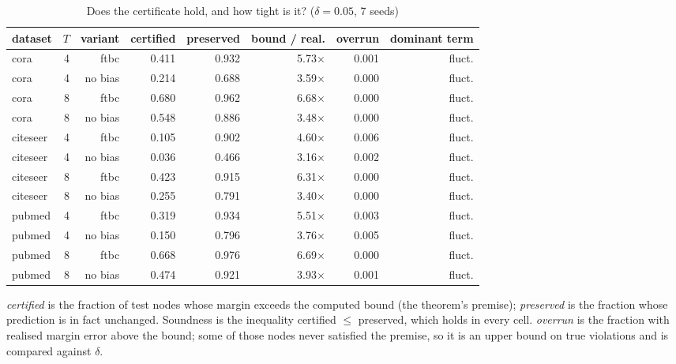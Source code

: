 \begin{table}[t]
\centering
\small
\caption{Does the certificate hold, and how tight is it? ($\delta = 0.05$, 7 seeds)}
\label{tab:theory}
\begin{tabular}{lrrrrrrr}
\toprule
dataset & $T$ & variant & certified & preserved & bound / real. & overrun & dominant term \\
\midrule
cora & 4 & ftbc & 0.411 & 0.932 & 5.73$\times$ & 0.001 & fluct. \\
cora & 4 & no bias & 0.214 & 0.688 & 3.59$\times$ & 0.000 & fluct. \\
cora & 8 & ftbc & 0.680 & 0.962 & 6.68$\times$ & 0.000 & fluct. \\
cora & 8 & no bias & 0.548 & 0.886 & 3.48$\times$ & 0.000 & fluct. \\
citeseer & 4 & ftbc & 0.105 & 0.902 & 4.60$\times$ & 0.006 & fluct. \\
citeseer & 4 & no bias & 0.036 & 0.466 & 3.16$\times$ & 0.002 & fluct. \\
citeseer & 8 & ftbc & 0.423 & 0.915 & 6.31$\times$ & 0.000 & fluct. \\
citeseer & 8 & no bias & 0.255 & 0.791 & 3.40$\times$ & 0.000 & fluct. \\
pubmed & 4 & ftbc & 0.319 & 0.934 & 5.51$\times$ & 0.003 & fluct. \\
pubmed & 4 & no bias & 0.150 & 0.796 & 3.76$\times$ & 0.005 & fluct. \\
pubmed & 8 & ftbc & 0.668 & 0.976 & 6.69$\times$ & 0.000 & fluct. \\
pubmed & 8 & no bias & 0.474 & 0.921 & 3.93$\times$ & 0.001 & fluct. \\
\bottomrule
\end{tabular}
\par\vspace{2pt}\footnotesize \emph{certified} is the fraction of test nodes whose margin exceeds the computed bound (the theorem's premise); \emph{preserved} is the fraction whose prediction is in fact unchanged. Soundness is the inequality certified $\le$ preserved, which holds in every cell. \emph{overrun} is the fraction with realised margin error above the bound; some of those nodes never satisfied the premise, so it is an upper bound on true violations and is compared against $\delta$.
\end{table}
